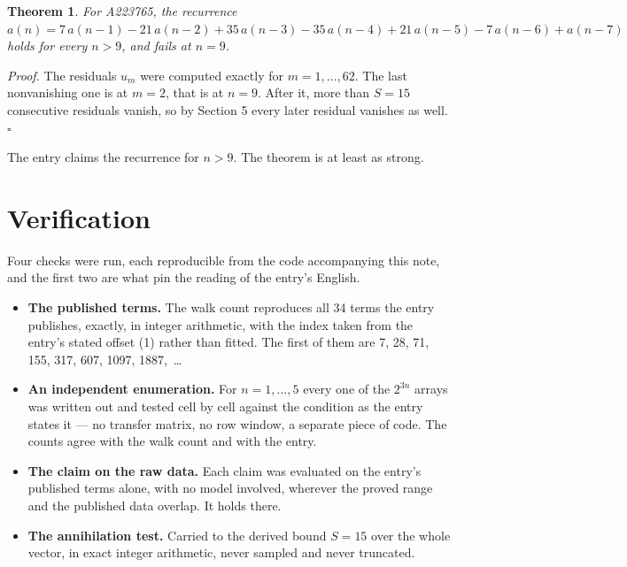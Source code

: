\documentclass[11pt]{article}
\newtheorem{theorem}{Theorem}
\theoremstyle{definition}
\begin{document}
\begin{theorem} For A223765, the recurrence $a(n) = 7\,a(n-1) - 21\,a(n-2) + 35\,a(n-3) - 35\,a(n-4) + 21\,a(n-5) - 7\,a(n-6) + a(n-7)$ holds for every $n > 9$, and fails at $n = 9$.\end{theorem}

{\itshape Proof.} The residuals $u_m$ were computed exactly for $m = 1,\dots,62$. The last nonvanishing one is at $m = 2$, that is at $n = 9$. After it, more than $S = 15$ consecutive residuals vanish, so by Section 5 every later residual vanishes as well. $\square$

The entry claims the recurrence for $n > 9$. The theorem is at least as strong.

\section{Verification}

Four checks were run, each reproducible from the code accompanying this note, and the first two are what pin the reading of the entry's English.

\begin{itemize}

\item {\bfseries The published terms.} The walk count reproduces all 34 terms the entry publishes, exactly, in integer arithmetic, with the index taken from the entry's stated offset (1) rather than fitted. The first of them are 7, 28, 71, 155, 317, 607, 1097, 1887,~\dots

\item {\bfseries An independent enumeration.} For $n = 1,\dots,5$ every one of the $2^{3n}$ arrays was written out and tested cell by cell against the condition as the entry states it --- no transfer matrix, no row window, a separate piece of code. The counts agree with the walk count and with the entry.

\item {\bfseries The claim on the raw data.} Each claim was evaluated on the entry's published terms alone, with no model involved, wherever the proved range and the published data overlap. It holds there.

\item {\bfseries The annihilation test.} Carried to the derived bound $S = 15$ over the whole vector, in exact integer arithmetic, never sampled and never truncated.

\end{itemize}
\end{document}
